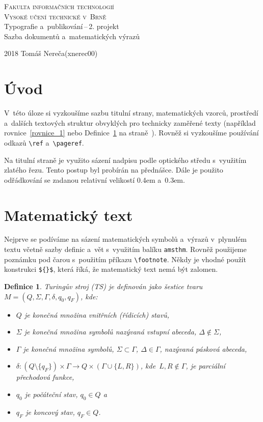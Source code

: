 \documentclass[a4paper, 11pt, twocolumn]{article}
\theoremstyle{plain}
\newtheorem{definition}{Definice}
\theoremstyle{plain}
\begin{document}
\begin{titlepage}
\begin{center}
	
	\textsc{\Huge Fakulta informačních technologií\\[3.5mm]
			Vysoké učení technické v~Brně}
	\\[79mm]
	{\LARGE Typografie a~publikování\,--\,2. projekt\\[2mm]
	Sazba dokumentů a~matematických výrazů}
	\vfill
\end{center}
{\Large 2018 \hfill Tomáš Nereča(xnerec00)}
\end{titlepage}

\section*{Úvod}
V~této úloze si vyzkoušíme sazbu titulní strany, matematických vzorců, prostředí a~dalších textových struktur obvyklých pro technicky zaměřené texty (například rovnice~\eqref{rovnice_1} nebo Definice~\ref{definice_1} na straně~\pageref{definice_1}). Rovněž si vyzkoušíme používání odkazů \verb|\ref| a~\verb|\pageref|.

Na titulní straně je využito sázení nadpisu podle optického středu s~využitím zlatého řezu. Tento postup byl probírán na přednášce. Dále je použito odřádkování se
zadanou relativní velikostí 0.4em a~0.3em.

\section{Matematický text}
Nejprve se podíváme na sázení matematických symbolů a~výrazů v~plynulém textu včetně sazby definic a~vět s~využitím balíku \verb|amsthm|. Rovněž použijeme poznámku pod čarou s~použitím příkazu \verb|\footnote|. Někdy je vhodné použít konstrukci \verb|${}$|, která říká, že matematický text nemá být zalomen.

\begin{definition} \label{definice_1}
\textnormal{Turingův stroj} (TS) je definován jako šestice tvaru $M=(Q,\Sigma,\Gamma,\delta, q_0, q_F)$, kde:
\begin{itemize}
\item $Q$ je konečná množina \textnormal{vnitřních (řídicích) stavů},
\item $\Sigma$ je konečná množina symbolů nazývaná \textnormal{vstupní abeceda}, $\Delta \not\in \Sigma$,
\item $\Gamma$ je konečná množina symbolů, $\Sigma\subset \Gamma$, $\Delta\in\Gamma$, nazývaná \textnormal{pásková abeceda},
\item $\delta:(Q\setminus\{q_F\})\times\Gamma\rightarrow Q\times(\Gamma\cup\{L,R\})$, kde\ $L,R\not\in\Gamma$, je parciální \textnormal{přechodová funkce},
\item $q_0$ je \textnormal{počáteční stav}, $q_0\in Q$ a
\item $q_F$ je \textnormal{koncový stav}, $q_F\in Q$.
\end{itemize}
\end{definition}
\end{document}
